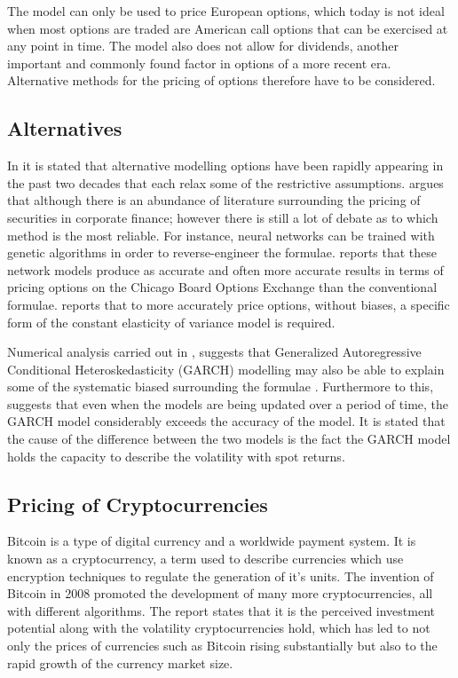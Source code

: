 \documentclass[12pt]{article}
\begin{document}
The \cite{BSReport} model can only be used to price European options, which today is not ideal when most options are traded are American call options that can be exercised at any point in time. The model also does not allow for dividends, another important and commonly found factor in options of a more recent era. Alternative methods for the pricing of options therefore have to be considered. 

\subsection{Alternatives}
In \cite{AlternativeModels} it is stated that alternative modelling options have been rapidly appearing in the past two decades that each relax some of the restrictive \cite{BSReport} assumptions. \cite{Australian} argues that although there is an abundance of literature surrounding the pricing of securities in corporate finance; however there is still a lot of debate as to which method is the most reliable. For instance, neural networks can be trained with genetic algorithms in order to reverse-engineer the \cite{BSReport} formulae. \cite{Zapart} reports that these network models produce as accurate and often more accurate results in terms of pricing options on the Chicago Board Options Exchange than the conventional formulae. \cite{Lauterbach} reports that to more accurately price options, without biases, a specific form of the constant elasticity of variance model is required. 

Numerical analysis carried out in \cite{Duan}, suggests that Generalized Autoregressive Conditional Heteroskedasticity (GARCH) modelling may also be able to explain some of the systematic biased surrounding the \cite{BSReport} formulae \citep{GARCH}. Furthermore to this, \cite{Heston2} suggests that even when the models are being updated over a period of time, the GARCH model considerably exceeds the accuracy of the \cite{BSReport} model. It is stated that the cause of the difference between the two models is the fact the GARCH model holds the capacity to describe the volatility with spot returns. 


\subsection{Pricing of Cryptocurrencies}
Bitcoin is a type of digital currency and a worldwide payment system. It is known as a cryptocurrency,  a term used to describe currencies which use encryption techniques to regulate the generation of it's units. The invention of Bitcoin in 2008 \cite{Nakamoto} promoted the development of many more cryptocurrencies, all with different algorithms. The report \cite{Chuen} states that it is the perceived investment potential along with the volatility cryptocurrencies hold, which has led to not only the prices of currencies such as Bitcoin rising substantially but also to the rapid growth of the currency market size. 
\end{document}
